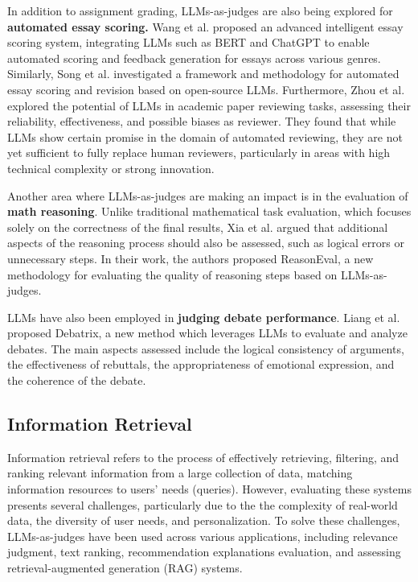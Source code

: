 In addition to assignment grading, LLMs-as-judges are also being explored for \textbf{automated essay scoring.} Wang et al. \cite{wang2024automated} proposed an advanced intelligent essay scoring system, integrating LLMs such as BERT and ChatGPT to enable automated scoring and feedback generation for essays across various genres. Similarly, Song et al. \cite{song2024automated} investigated a framework and methodology for automated essay scoring and revision based on open-source LLMs. Furthermore, Zhou et al. \cite{zhou2024llm} explored the potential of LLMs in academic paper reviewing tasks, assessing their reliability, effectiveness, and possible biases as reviewer. They found that while LLMs show certain promise in the domain of automated reviewing, they are not yet sufficient to fully replace human reviewers, particularly in areas with high technical complexity or strong innovation.

Another area where LLMs-as-judges are making an impact is in the evaluation of \textbf{math reasoning}. Unlike traditional mathematical task evaluation, which focuses solely on the correctness of the final results, Xia et al. \cite{xia2024evaluating} argued that additional aspects of the reasoning process should also be assessed, such as logical errors or unnecessary steps. In their work, the authors proposed ReasonEval, a new methodology for evaluating the quality of reasoning steps based on LLMs-as-judges.

LLMs have also been employed in \textbf{judging debate performance}. Liang et al. \cite{liang2024debatrix} proposed Debatrix, a new method which leverages LLMs to evaluate and analyze debates. The main aspects assessed include the logical consistency of arguments, the effectiveness of rebuttals, the appropriateness of emotional expression, and the coherence of the debate.

\subsection{Information Retrieval}
\label{sec: Information Retrieval}
Information retrieval refers to the process of effectively retrieving, filtering, and ranking relevant information from a large collection of data, matching information resources to users' needs (queries). However, evaluating these systems presents several challenges, particularly due to the the complexity of real-world data, the diversity of user needs, and personalization. To solve these challenges, LLMs-as-judges have been used across various applications, including relevance judgment, text ranking, recommendation explanations evaluation, and assessing retrieval-augmented generation (RAG) systems.

